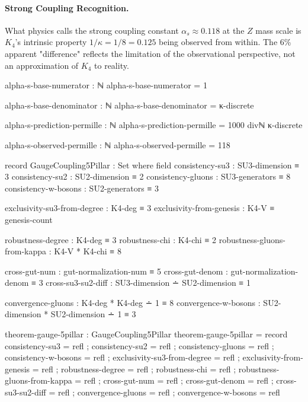 \documentclass[11pt,a4paper]{book}
\begin{document}
\paragraph{Strong Coupling Recognition.}
What physics calls the strong coupling constant $\alpha_s \approx 0.118$ at the $Z$ mass scale is $K_4$'s intrinsic property $1/\kappa = 1/8 = 0.125$ being observed from within. The 6\% apparent "difference" reflects the limitation of the observational perspective, not an approximation of $K_4$ to reality.

\begin{code}
alpha-s-base-numerator : ℕ
alpha-s-base-numerator = 1

alpha-s-base-denominator : ℕ
alpha-s-base-denominator = κ-discrete

alpha-s-prediction-permille : ℕ
alpha-s-prediction-permille = 1000 divℕ κ-discrete
\end{code}

\begin{code}
alpha-s-observed-permille : ℕ
alpha-s-observed-permille = 118


record GaugeCoupling5Pillar : Set where
  field
    consistency-su3 : SU3-dimension ≡ 3
    consistency-su2 : SU2-dimension ≡ 2
    consistency-gluons : SU3-generators ≡ 8
    consistency-w-bosons : SU2-generators ≡ 3
    
    exclusivity-su3-from-degree : K4-deg ≡ 3
    exclusivity-from-genesis    : K4-V ≡ genesis-count
    
    robustness-degree : K4-deg ≡ 3
    robustness-chi : K4-chi ≡ 2
    robustness-gluons-from-kappa : K4-V * K4-chi ≡ 8
    
    cross-gut-num : gut-normalization-num ≡ 5
    cross-gut-denom : gut-normalization-denom ≡ 3
    cross-su3-su2-diff : SU3-dimension ∸ SU2-dimension ≡ 1
    
    convergence-gluons : K4-deg * K4-deg ∸ 1 ≡ 8
    convergence-w-bosons : SU2-dimension * SU2-dimension ∸ 1 ≡ 3

theorem-gauge-5pillar : GaugeCoupling5Pillar
theorem-gauge-5pillar = record
  { consistency-su3 = refl
  ; consistency-su2 = refl
  ; consistency-gluons = refl
  ; consistency-w-bosons = refl
  ; exclusivity-su3-from-degree = refl
  ; exclusivity-from-genesis = refl
  ; robustness-degree = refl
  ; robustness-chi = refl
  ; robustness-gluons-from-kappa = refl
  ; cross-gut-num = refl
  ; cross-gut-denom = refl
  ; cross-su3-su2-diff = refl
  ; convergence-gluons = refl
  ; convergence-w-bosons = refl
  }
\end{code}
\end{document}
